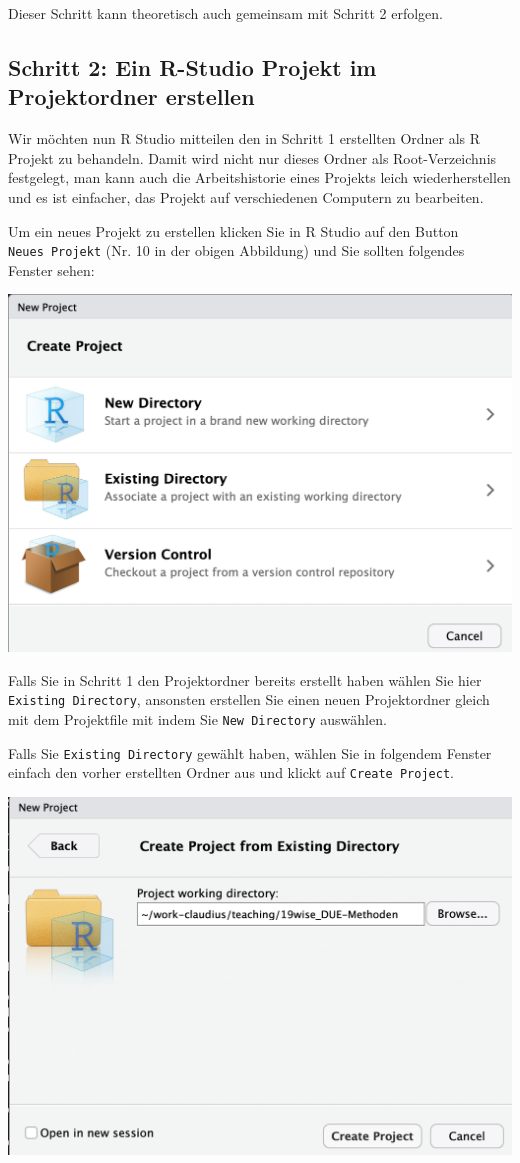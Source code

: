 \documentclass[]{tufte-book}
\begin{document}
Dieser Schritt kann theoretisch auch gemeinsam mit Schritt 2 erfolgen.

\subsection{Schritt 2: Ein R-Studio Projekt im Projektordner
erstellen}\label{schritt-2-ein-r-studio-projekt-im-projektordner-erstellen}

Wir möchten nun R Studio mitteilen den in Schritt 1 erstellten Ordner
als R Projekt zu behandeln. Damit wird nicht nur dieses Ordner als
Root-Verzeichnis festgelegt, man kann auch die Arbeitshistorie eines
Projekts leich wiederherstellen und es ist einfacher, das Projekt auf
verschiedenen Computern zu bearbeiten.

Um ein neues Projekt zu erstellen klicken Sie in R Studio auf den Button
\texttt{Neues\ Projekt} (Nr. 10 in der obigen Abbildung) und Sie sollten
folgendes Fenster sehen:

\begin{center}\includegraphics[width=0.6\linewidth]{figures/r-studio-new-project} \end{center}

Falls Sie in Schritt 1 den Projektordner bereits erstellt haben wählen
Sie hier \texttt{Existing\ Directory}, ansonsten erstellen Sie einen
neuen Projektordner gleich mit dem Projektfile mit indem Sie
\texttt{New\ Directory} auswählen.

Falls Sie \texttt{Existing\ Directory} gewählt haben, wählen Sie in
folgendem Fenster einfach den vorher erstellten Ordner aus und klickt
auf \texttt{Create\ Project}.

\begin{center}\includegraphics[width=0.6\linewidth]{figures/r-studio-new-project-exis-dir} \end{center}
\end{document}
